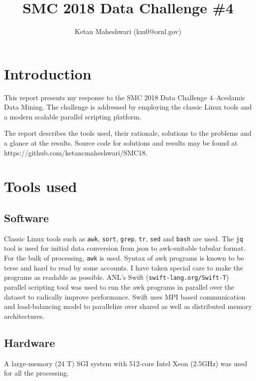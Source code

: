 \documentclass{article}
\title{SMC 2018 Data Challenge \#4}
\author{Ketan Maheshwari (km0@ornl.gov)}
\begin{document}
\maketitle
\section*{Introduction}

This report presents my response to the SMC 2018 Data Challenge 4--Acedamic
Data Mining.  The challenge is addressed by employing the classic Linux tools
and a modern scalable parallel scripting platform.

The report describes the tools used, their rationale, solutions to the problems
and a glance at the results. Source code for solutions and results may be found
at https://github.com/ketancmaheshwari/SMC18.

\section*{Tools used}
\subsection*{Software}
Classic Linux tools such as \texttt{awk}, \texttt{sort}, \texttt{grep},
\texttt{tr}, \texttt{sed} and \texttt{bash} are used.  The \texttt{jq} tool is
used for initial data conversion from json to awk-suitable tabular format. For
the bulk of processing, \texttt{awk} is used. Syntax of awk programs is known
to be terse and hard to read by some accounts. I have taken special care to
make the programs as readable as possible.  ANL's Swift
(\texttt{swift-lang.org/Swift-T}) parallel scripting tool was used to run the
awk programs in parallel over the dataset to radically improve performance.
Swift uses MPI based communication and load-balancing model to parallelize over
shared as well as distributed memory architectures.

\subsection*{Hardware}
A large-memory (24 T) SGI system with 512-core Intel Xeon (2.5GHz) was used for
all the processing.
\end{document}

